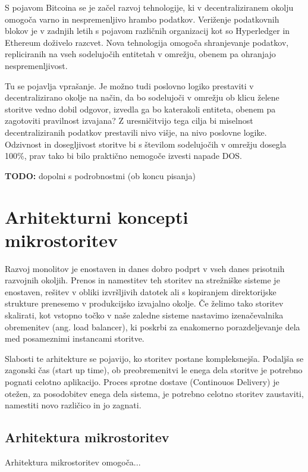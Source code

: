 \documentclass[a4paper, 12pt]{book}
\begin{document}
S pojavom Bitcoina se je začel razvoj tehnologije, ki v decentraliziranem okolju omogoča varno in nespremenljivo hrambo podatkov.
Veriženje podatkovnih blokov je v zadnjih letih s pojavom različnih organizacij kot so Hyperledger in Ethereum doživelo razcvet.
Nova tehnologija omogoča shranjevanje podatkov, repliciranih na vseh sodelujočih entitetah v omrežju, obenem pa ohranjajo nespremenljivost.

Tu se pojavlja vprašanje. 
Je možno tudi poslovno logiko prestaviti v decentralizirano okolje na način, da bo sodelujoči v omrežju ob klicu želene storitve vedno dobil odgovor, izvedla ga bo katerakoli entiteta, obenem pa zagotoviti pravilnost izvajana?
Z uresničitvijo tega cilja bi miselnost decentraliziranih podatkov prestavili nivo višje, na nivo poslovne logike.
Odzivnost in dosegljivost storitve bi s številom sodelujočih v omrežju dosegla 100\%, prav tako bi bilo praktično nemogoče izvesti napade DOS.

\textbf{TODO:} dopolni s podrobnostmi (ob koncu pisanja)


\chapter{Arhitekturni koncepti mikrostoritev}
\label{ch1}

Razvoj monolitov je enostaven in danes dobro podprt v vseh danes prisotnih razvojnih okoljih.
Prenos in namestitev teh storitev na strežniške sisteme je enostaven, rešitev v obliki izvršljivih datotek ali s kopiranjem direktorijske strukture prenesemo v produkcijsko izvajalno okolje.
Če želimo tako storitev skalirati, kot vstopno točko v naše zaledne sisteme nastavimo izenačevalnika obremenitev (ang. load balancer), ki poskrbi za enakomerno porazdeljevanje dela med posameznimi instancami storitve.

Slabosti te arhitekture se pojavijo, ko storitev postane kompleksnejša.
Podaljša se zagonski čas (start up time), ob preobremenitvi le enega dela storitve je potrebno pognati celotno aplikacijo.
Proces sprotne dostave (Continouos Delivery) je otežen, za posodobitev enega dela sistema, je potrebno celotno storitev zaustaviti, namestiti novo različico in jo zagnati. \cite{monolithMicroservice}


\section{Arhitektura mikrostoritev}

Arhitektura mikrostoritev omogoča...
\end{document}
